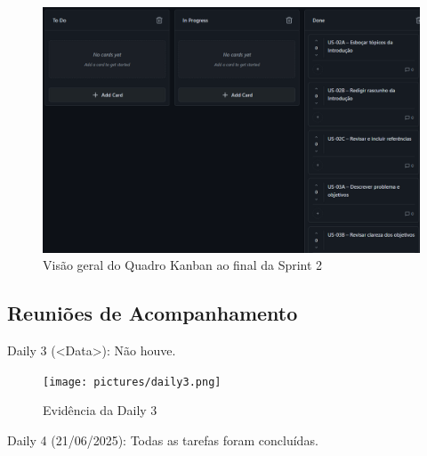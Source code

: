 \begin{figure}[htbp]
  \centering
  \includegraphics[width=0.8\linewidth]{pictures/kanban_sprint2_final.png}
  \caption{Visão geral do Quadro Kanban ao final da Sprint 2}
\end{figure}


\subsection{Reuniões de Acompanhamento}

Daily 3 (\textless Data\textgreater): Não houve.

\begin{figure}[htbp]
  \centering
  \texttt{[image: pictures/daily3.png]}
  \caption{Evidência da Daily 3}
\end{figure}

Daily 4 (21/06/2025): Todas as tarefas foram concluídas.

